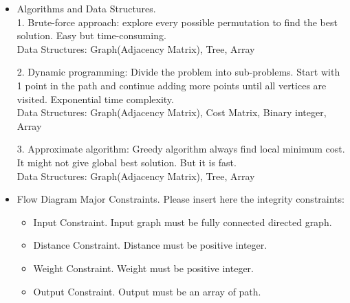 \begin{itemize}
\item{Algorithms and  Data Structures. }
\\
1. Brute-force approach: explore every possible permutation to find the best solution. Easy but time-consuming.
\\
Data Structures: Graph(Adjacency Matrix), Tree, Array
\par
2. Dynamic programming: Divide the problem into sub-problems. Start with 1 point in the path and continue adding more points until all vertices are visited. Exponential time complexity.
\\
Data Structures: Graph(Adjacency Matrix), Cost Matrix, Binary integer, Array
\par
3. Approximate algorithm: Greedy algorithm always find local minimum cost. It might not give global best solution. But it is fast.
\\
Data Structures: Graph(Adjacency Matrix), Tree, Array
\end{itemize}

\begin{itemize} 
\item{  Flow Diagram Major Constraints.}
Please insert here the integrity constraints:
\begin{itemize} 
\item{ Input Constraint. }
Input graph must be fully connected directed graph.
\end{itemize}
\begin{itemize} 
\item{ Distance Constraint. }
Distance must be positive integer.
\end{itemize}
\begin{itemize} 
\item{ Weight Constraint. }
Weight must be positive integer.
\end{itemize}
\begin{itemize} 
\item{ Output Constraint. }
Output must be an array of path.
\end{itemize}
\end{itemize}